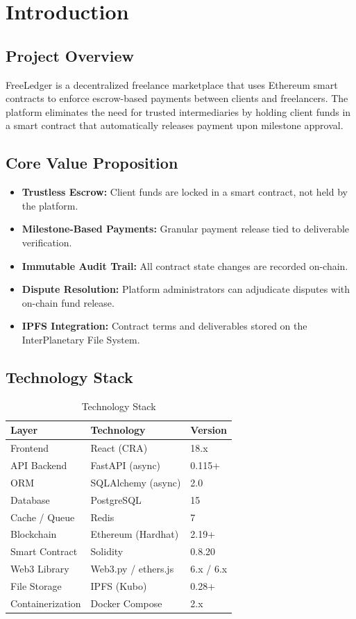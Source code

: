 \documentclass[12pt,a4paper]{article}
\begin{document}
\section{Introduction}

\subsection{Project Overview}
FreeLedger is a decentralized freelance marketplace that uses Ethereum smart contracts to enforce escrow-based payments between clients and freelancers. The platform eliminates the need for trusted intermediaries by holding client funds in a smart contract that automatically releases payment upon milestone approval.

\subsection{Core Value Proposition}
\begin{itemize}[nosep]
    \item \textbf{Trustless Escrow:} Client funds are locked in a smart contract, not held by the platform.
    \item \textbf{Milestone-Based Payments:} Granular payment release tied to deliverable verification.
    \item \textbf{Immutable Audit Trail:} All contract state changes are recorded on-chain.
    \item \textbf{Dispute Resolution:} Platform administrators can adjudicate disputes with on-chain fund release.
    \item \textbf{IPFS Integration:} Contract terms and deliverables stored on the InterPlanetary File System.
\end{itemize}

\subsection{Technology Stack}
\begin{table}[h]
\centering
\begin{tabular}{lll}
\toprule
\textbf{Layer} & \textbf{Technology} & \textbf{Version} \\
\midrule
Frontend & React (CRA) & 18.x \\
API Backend & FastAPI (async) & 0.115+ \\
ORM & SQLAlchemy (async) & 2.0 \\
Database & PostgreSQL & 15 \\
Cache / Queue & Redis & 7 \\
Blockchain & Ethereum (Hardhat) & 2.19+ \\
Smart Contract & Solidity & 0.8.20 \\
Web3 Library & Web3.py / ethers.js & 6.x / 6.x \\
File Storage & IPFS (Kubo) & 0.28+ \\
Containerization & Docker Compose & 2.x \\
\bottomrule
\end{tabular}
\caption{Technology Stack}
\end{table}
\end{document}

